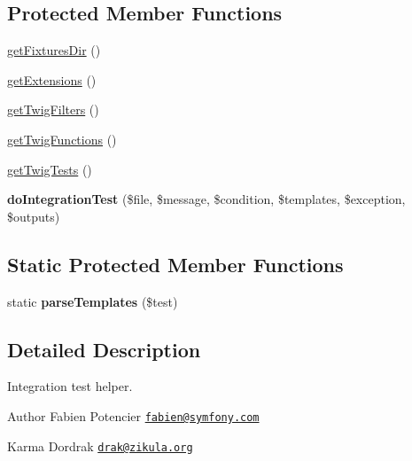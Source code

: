 \subsection*{Protected Member Functions}
\begin{DoxyCompactItemize}
\item 
\hyperlink{classTwig__Test__IntegrationTestCase_a0b68953fd30922fa6a4a7c74d0d3eaf7}{get\+Fixtures\+Dir} ()
\item 
\hyperlink{classTwig__Test__IntegrationTestCase_aa5216b835f6318620bb19c06718fa8b8}{get\+Extensions} ()
\item 
\hyperlink{classTwig__Test__IntegrationTestCase_a02351d8d16ca2e1b8577198ed0615141}{get\+Twig\+Filters} ()
\item 
\hyperlink{classTwig__Test__IntegrationTestCase_aa8e5f3d0ae1a58cde03912601b02ab96}{get\+Twig\+Functions} ()
\item 
\hyperlink{classTwig__Test__IntegrationTestCase_ad73537d858ccd9d00885ccbf672a4637}{get\+Twig\+Tests} ()
\item 
{\bfseries do\+Integration\+Test} (\$file, \$message, \$condition, \$templates, \$exception, \$outputs)\hypertarget{classTwig__Test__IntegrationTestCase_adbb01d52ddfb3627e3882ae36b1a172f}{}\label{classTwig__Test__IntegrationTestCase_adbb01d52ddfb3627e3882ae36b1a172f}

\end{DoxyCompactItemize}
\subsection*{Static Protected Member Functions}
\begin{DoxyCompactItemize}
\item 
static {\bfseries parse\+Templates} (\$test)\hypertarget{classTwig__Test__IntegrationTestCase_a849e8b716c687905fc770c88e3c664a4}{}\label{classTwig__Test__IntegrationTestCase_a849e8b716c687905fc770c88e3c664a4}

\end{DoxyCompactItemize}


\subsection{Detailed Description}
Integration test helper.

\begin{DoxyAuthor}{Author}
Fabien Potencier \href{mailto:fabien@symfony.com}{\tt fabien@symfony.\+com} 

Karma Dordrak \href{mailto:drak@zikula.org}{\tt drak@zikula.\+org} 
\end{DoxyAuthor}



